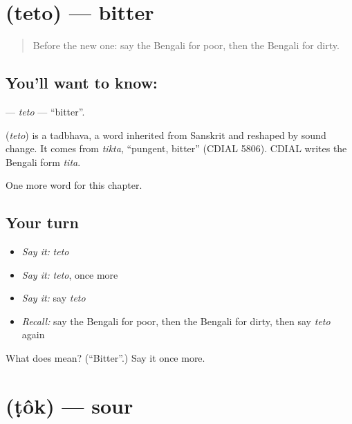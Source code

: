 \section[\texorpdfstring{\bn{তেতো} (teto)}{তেতো (teto)}]{ (teto) — bitter}

\label{lesson:BN-C75-teto}



\begin{quote}
Before the new one: say the Bengali for poor, then the Bengali for dirty.
\end{quote}

\subsection*{You'll want to know: }
\textbf{} — \emph{teto} — \textquotedblleft{}bitter\textquotedblright{}.

\begin{cousinweb}
\textbf{} (\emph{teto}) is a tadbhava, a word inherited from Sanskrit and reshaped by sound change. It comes from \emph{tikta}, \textquotedblleft{}pungent, bitter\textquotedblright{} (CDIAL 5806). CDIAL writes the Bengali form \emph{tita}.
\end{cousinweb}

\begin{grammarlens}[title={What you've built}]
One more word for this chapter.
\end{grammarlens}

\subsection*{Your turn}
\begin{itemize}
\raggedright
  \item \emph{Say it:} \emph{teto}
  \item \emph{Say it:} \emph{teto}, once more
  \item \emph{Say it:} say \emph{teto}
  \item \emph{Recall:} say the Bengali for poor, then the Bengali for dirty, then say \emph{teto} again
\end{itemize}

\begin{tcolorbox}[breakable,colback=teal!4,colframe=teal!35!black,title={Before you move on}]
What does  mean? (\textquotedblleft{}Bitter\textquotedblright{}.) Say it once more.
\end{tcolorbox}
\section[\texorpdfstring{\bn{টক} (ṭôk)}{টক (ṭôk)}]{ (ṭôk) — sour}

